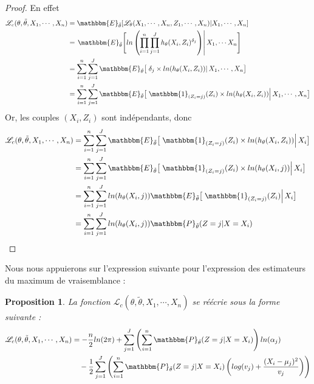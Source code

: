 \documentclass[frenchb]{report}
\newcommand{\1}{\mathbbm{1}}
\newcommand{\E}{\mathbbm{E}}
\newcommand{\prob}{\mathbbm{P}}
\newcommand{\lv}{\mathcal{L}}
\newcommand{\thetat}{\tilde{\theta}}
\newtheorem{prop}{Proposition}
\theoremstyle{definition}\newtheorem{defn}{Définition}
\theoremstyle{definition}\newtheorem{exm}{Exemple}
\theoremstyle{definition}\newtheorem{nota}{Notation}
\theoremstyle{definition}\newtheorem{rem}{Remarque}
\begin{document}
\begin{proof}
En effet
\begin{align*}
\lv_{c}(\theta, \thetat, X_1, \cdots, X_n) &= \E_{\thetat}[\lv_\theta(X_1, \cdots, X_n, Z_1, \cdots, X_n)|X_1, \cdots, X_n]\\
&=\left.  \E_{\thetat}\Bigg[\displaystyle ln\left(\prod_{i=1}^n \prod_{j=1}^J h_\theta(X_i,Z_i)^{\delta_j}\right)  \right| X_1, \cdots X_n \Bigg]\\
&= \displaystyle\sum_{i=1}^n\sum_{j=1}^J  \E_{\thetat}\big[\left.\delta_j\times ln(h_\theta(X_i,Z_i))\right|X_1, \cdots, X_n\big]\\
&= \displaystyle\sum_{i=1}^n\sum_{j=1}^J  \E_{\thetat}\big[\left.\1_{(Z_i=j)}(Z_i)\times ln(h_\theta(X_i,Z_i))\right|X_1, \cdots, X_n\big]\\
\end{align*}
Or, les couples $(X_i, Z_i)$ sont indépendants, donc
\begin{align*}
\lv_{c}(\theta, \thetat, X_1, \cdots, X_n) &= \displaystyle\sum_{i=1}^n\sum_{j=1}^J  \E_{\thetat}\big[\left.\1_{(Z_i=j)}(Z_i)\times ln(h_\theta(X_i,Z_i))\right|X_i\big]\\
&= \displaystyle\sum_{i=1}^n\sum_{j=1}^J  \E_{\thetat}\big[\left.\1_{(Z_i=j)}(Z_i)\times ln(h_\theta(X_i,j))\right|X_i\big]\\
&= \displaystyle\sum_{i=1}^n\sum_{j=1}^Jln(h_\theta(X_i,j))  \E_{\thetat}\big[\left.\1_{(Z_i=j)}(Z_i)\right|X_i\big]\\
&=\displaystyle\sum_{i=1}^n\sum_{j=1}^Jln(h_\theta(X_i,j)) \prob_{\thetat}(Z=j|X=X_i)
\end{align*}
\end{proof}

Nous nous appuierons sur l'expression suivante pour l'expression des estimateurs du maximum de vraisemblance :

\begin{prop} La fonction $\lv_{c}(\theta, \thetat, X_1, \cdots, X_n)$ se réécrie sous la forme suivante : 
\begin{align*}
 \lv_{c}(\theta, \thetat, X_1, \cdots, X_n) &= -\frac{n}{2}ln(2\pi)+\sum_{j=1}^J \left(\sum_{i = 1}^n \prob_{\thetat}(Z= j|X=X_i)\right) ln(\alpha_j)\\
&~~~-\frac{1}{2}\sum_{j=1}^J\left(\sum_{i=1}^n  \prob_{\thetat}(Z=j|X=X_i)\left(log(v_j)+\frac{(X_i-\mu_j)^2}{v_j}\right)\right)
\end{align*}
\end{prop}
\end{document}
